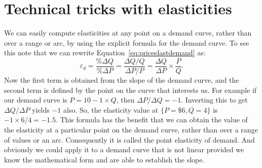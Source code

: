 \section{Technical tricks with elasticities}\label{sec:ch4sec8}

We can easily compute elasticities at any point on a demand curve, rather
than over a range or arc, by using the explicit formula for the demand
curve. To see this note that we can rewrite Equation~\ref{eq:priceelastdemand} as: 
\begin{equation*}
\varepsilon_{d}=\frac{\%\Delta Q}{\%\Delta P}=\frac{\Delta Q/Q}{\Delta P/P}=%
\frac{\Delta Q}{\Delta P}\times \frac{P}{Q}.
\end{equation*}%
Now the first term is obtained from the slope of the demand curve, and the
second term is defined by the point on the curve that interests us. For
example if our demand curve is $P=10-1\times Q$, then $\Delta P/\Delta Q=-1$.
Inverting this to get $\Delta Q/\Delta P$ yields $-1$ also. So, the
elasticity value at $\{P=\$6,Q=4\}$ is $-1\times 6/4=-1.5$. This formula has
the benefit that we can obtain the value of the elasticity at a particular
point on the demand curve, rather than over a range of values or an arc.
Consequently it is called the point elasticity of demand. And obviously we
could apply it to a demand curve that is not linear provided we know the
mathematical form and are able to establish the slope.